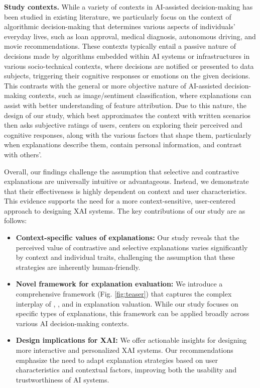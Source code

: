 \textbf{Study contexts.} While a variety of contexts in AI-assisted decision-making has been studied in existing literature, we particularly focus on the context of algorithmic decision-making that determines various aspects of individuals’ everyday lives, such as loan approval, medical diagnosis, autonomous driving, and movie recommendations. These contexts typically entail a passive nature of decisions made by algorithms embedded within AI systems or infrastructures in various socio-technical contexts, where decisions are notified or presented to data subjects, triggering their cognitive responses or emotions on the given decisions. This contrasts with the general or more objective nature of AI-assisted decision-making contexts, such as image/sentiment classification, where explanations can assist with better understanding of feature attribution. Due to this nature, the design of our study, which best approximates the context with written scenarios then asks subjective ratings of users, centers on exploring their perceived and cognitive responses, along with the various factors that shape them, particularly when explanations describe them, contain personal information, and contrast with others’.

Overall, our findings challenge the assumption that selective and contrastive explanations are universally intuitive or advantageous. Instead, we demonstrate that their effectiveness is highly dependent on context and user characteristics. This evidence supports the need for a more context-sensitive, user-centered approach to designing XAI systems. The key contributions of our study are as follows:
\begin{itemize}
\item {\bf Context-specific values of explanations:} Our study reveals that the perceived value of contrastive and selective explanations varies significantly by context and individual traits, challenging the assumption that these strategies are inherently human-friendly.
\item {\bf Novel framework for explanation evaluation:} We introduce a comprehensive framework (Fig. \ref{fig:teaser}) that captures the complex interplay of , , and  in explanation valuation. While our study focuses on specific types of explanations, this framework can be applied broadly across various AI decision-making contexts.
\item {\bf Design implications for XAI:} We offer actionable insights for designing more interactive and personalized XAI systems. Our recommendations emphasize the need to adapt explanation strategies based on user characteristics and contextual factors, improving both the usability and trustworthiness of AI systems.
\end{itemize}
